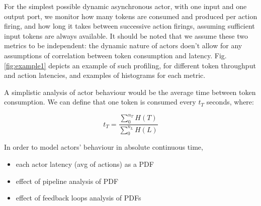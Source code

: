 For the simplest possible dynamic asynchronous actor, with one input and one output port, we monitor how many tokens are consumed and produced per action firing, and how long it takes between successive action firings, assuming sufficient input tokens are always available. It should be noted that we assume these two metrics to be independent: the dynamic nature of actors doen't allow for any assumptions of correlation between token consumption and latency. Fig. \ref{fig:example1} depicts an example of such profiling, for different token throughput and action latencies, and examples of histograms for each metric.
\par A simplistic analysis of actor behaviour would be the average time between token consumption. We can define that one token is consumed every $t_T$ seconds, where:

\begin{equation}
t_T = \frac{\sum_{0}^{n_T} H(T)}{\sum_{0}^{n_L} H(L)} 
\end{equation}


\par In order to model actors' behaviour in absolute continuous time, 

\begin{itemize}
\item each actor latency (avg of actions) as a PDF
\item effect of pipeline analysis of PDF
\item effect of feedback loops analysis of PDFs
\end{itemize}

